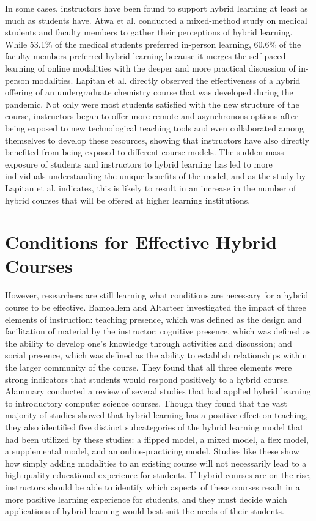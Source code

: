 In some cases, instructors have been found to support hybrid learning at least as much as students have. Atwa et al. \cite{atwa2022online} conducted a mixed-method study on medical students and faculty members to gather their perceptions of hybrid learning. While 53.1\% of the medical students preferred in-person learning, 60.6\% of the faculty members preferred hybrid learning because it merges the self-paced learning of online modalities with the deeper and more practical discussion of in-person modalities. Lapitan et al. \cite{lapitan2021effective} directly observed the effectiveness of a hybrid offering of an undergraduate chemistry course that was developed during the pandemic. Not only were most students satisfied with the new structure of the course, instructors began to offer more remote and asynchronous options after being exposed to new technological teaching tools and even collaborated among themselves to develop these resources, showing that instructors have also directly benefited from being exposed to different course models. The sudden mass exposure of students and instructors to hybrid learning has led to more individuals understanding the unique benefits of the model, and as the study by Lapitan et al. indicates, this is likely to result in an increase in the number of hybrid courses that will be offered at higher learning institutions.

\section{Conditions for Effective Hybrid Courses}

However, researchers are still learning what conditions are necessary for a hybrid course to be effective. Bamoallem and Altarteer \cite{bamoallem2022remote} investigated the impact of three elements of instruction: teaching presence, which was defined as the design and facilitation of material by the instructor; cognitive presence, which was defined as the ability to develop one's knowledge through activities and discussion; and social presence, which was defined as the ability to establish relationships within the larger community of the course. They found that all three elements were strong indicators that students would respond positively to a hybrid course. Alammary \cite{alammary2019blended} conducted a review of several studies that had applied hybrid learning to introductory computer science courses. Though they found that the vast majority of studies showed that hybrid learning has a positive effect on teaching, they also identified five distinct subcategories of the hybrid learning model that had been utilized by these studies: a flipped model, a mixed model, a flex model, a supplemental model, and an online-practicing model. Studies like these show how simply adding modalities to an existing course will not necessarily lead to a high-quality educational experience for students. If hybrid courses are on the rise, instructors should be able to identify which aspects of these courses result in a more positive learning experience for students, and they must decide which applications of hybrid learning would best suit the needs of their students.

